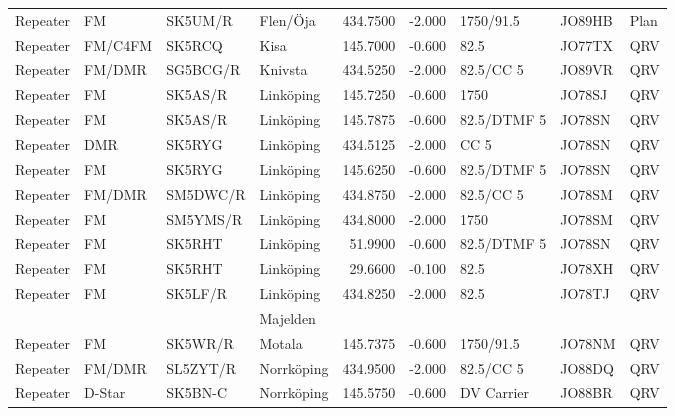 \begin{longtable}{llllrrlll}
Repeater & FM         & SK5UM/R  & Flen/Öja          & 434.7500     & -2.000     & 1750/91.5       & JO89HB      & Plan     \\
Repeater & FM/C4FM    & SK5RCQ   & Kisa              & 145.7000     & -0.600     & 82.5            & JO77TX      & QRV      \\
Repeater & FM/DMR     & SG5BCG/R & Knivsta           & 434.5250     & -2.000     & 82.5/CC 5       & JO89VR      & QRV      \\
Repeater & FM         & SK5AS/R  & Linköping         & 145.7250     & -0.600     & 1750            & JO78SJ      & QRV      \\
Repeater & FM         & SK5AS/R  & Linköping         & 145.7875     & -0.600     & 82.5/DTMF 5     & JO78SN      & QRV      \\
Repeater & DMR        & SK5RYG   & Linköping         & 434.5125     & -2.000     & CC 5            & JO78SN      & QRV      \\
Repeater & FM         & SK5RYG   & Linköping         & 145.6250     & -0.600     & 82.5/DTMF 5     & JO78SN      & QRV      \\
Repeater & FM/DMR     & SM5DWC/R & Linköping         & 434.8750     & -2.000     & 82.5/CC 5       & JO78SM      & QRV      \\
Repeater & FM         & SM5YMS/R & Linköping         & 434.8000     & -2.000     & 1750            & JO78SM      & QRV      \\
Repeater & FM         & SK5RHT   & Linköping         & 51.9900      & -0.600     & 82.5/DTMF 5     & JO78SN      & QRV      \\
Repeater & FM         & SK5RHT   & Linköping         & 29.6600      & -0.100     & 82.5            & JO78XH      & QRV      \\
Repeater & FM         & SK5LF/R  & Linköping         & 434.8250     & -2.000     & 82.5            & JO78TJ      & QRV      \\
         &            &          & Majelden          &              &            &                 &             &          \\
Repeater & FM         & SK5WR/R  & Motala            & 145.7375     & -0.600     & 1750/91.5       & JO78NM      & QRV      \\
Repeater & FM/DMR     & SL5ZYT/R & Norrköping        & 434.9500     & -2.000     & 82.5/CC 5       & JO88DQ      & QRV      \\
Repeater & D-Star     & SK5BN-C  & Norrköping        & 145.5750     & -0.600     & DV Carrier      & JO88BR      & QRV      \\

\end{longtable}
